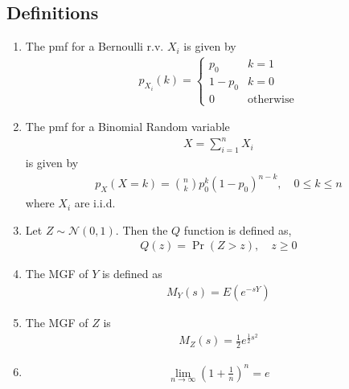 \documentclass[journal,12pt,onecolumn]{IEEEtran}
\renewcommand\thesection{\arabic{section}}
\renewcommand\thesubsection{\thesection.\arabic{subsection}}
\providecommand{\pr}[1]{\ensuremath{\Pr\left(#1\right)}}
\providecommand{\brak}[1]{\ensuremath{\left(#1\right)}}
\theoremstyle{remark}
\numberwithin{equation}{section}
\begin{document}
 \subsection{Definitions}
\begin{enumerate}[label=\arabic*.,ref=\thesubsection.\theenumi]
\item The pmf for a Bernoulli r.v. $X_i$ is given by 
    \begin{align}
	    p_{X_i}(k) =
    \begin{cases}
p_0 & k = 1
\\
1-p_0 & k = 0
\\
0 & \text{otherwise}
    \end{cases}
\end{align}
\item The pmf for a Binomial Random variable 
\begin{align}
	X = \sum_{i=1}^{n}X_i
\end{align}
is given by 
\begin{align}
 p_X\brak{X=k}  = \binom{n}{k}  p_0^k \brak{1-p_0}^{n-k}, \quad 0 \le k \le n
\end{align}
where $X_i$ are i.i.d.
\item Let 
 $Z \sim \mathcal{N}(0, 1)$.  Then the 
	$Q$ function is defined as,
\begin{align}
	Q(z) = \pr{Z>z}, \quad z \ge 0
\end{align}
\item The MGF of $Y$ is defined as 
\begin{align}
	M_{Y}(s) = E\brak{e^{-sY}}
\end{align}
\item The MGF of $Z$ is 
\begin{align}
	M_Z(s) = \frac{1}{2}e^{\frac{1}{2}s^2}
\end{align}
\item 
\begin{align}
	\lim_{n \to \infty}	\brak{1 + \frac{1}{n}}^{n} = e 
\end{align}

 \end{enumerate}
\end{document}
